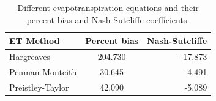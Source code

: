 
	\begin{table}[h!]
	\caption[Different evapotranspiration equations ]{Different evapotranspiration equations and their percent bias and Nash-Sutcliffe coefficients.}
	\centering
		\begin{tabular}{ l c r }
		\hline
			ET Method         &	Percent bias & Nash-Sutcliffe \\
			\hline	\hline
			Hargreaves        &	204.730	& 	-17.873	\\
			Penman-Monteith	  &	30.645	&	-4.491 	\\
			Preistley-Taylor  &	42.090	&	-5.089 	\\
			\hline
		\end{tabular}
		\label{table:et_method}
			\end{table}	
\begin{landscape}

\end{landscape}